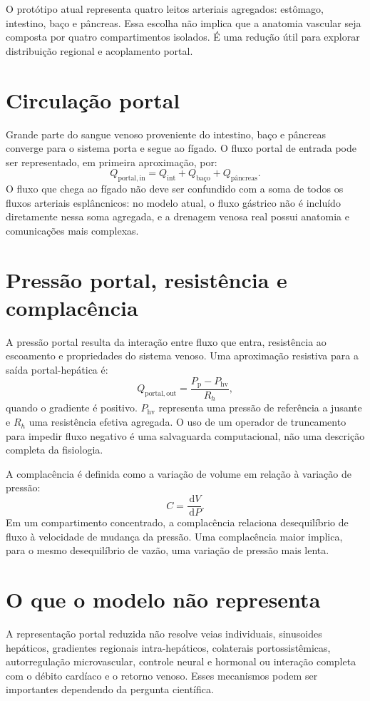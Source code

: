 \documentclass[11pt,a4paper,oneside]{book}
\newcommand{\dd}{\,\mathrm{d}}
\newcommand{\Qportin}{Q_{\mathrm{portal,in}}}
\newcommand{\Qportout}{Q_{\mathrm{portal,out}}}
\newcommand{\Pport}{P_{\mathrm{p}}}
\begin{document}
O protótipo atual representa quatro leitos arteriais agregados: estômago, intestino, baço e pâncreas. Essa escolha não implica que a anatomia vascular seja composta por quatro compartimentos isolados. É uma redução útil para explorar distribuição regional e acoplamento portal.

\section{Circulação portal}
Grande parte do sangue venoso proveniente do intestino, baço e pâncreas converge para o sistema porta e segue ao fígado. O fluxo portal de entrada pode ser representado, em primeira aproximação, por:
\begin{equation}
  \Qportin=Q_{\mathrm{int}}+Q_{\mathrm{baço}}+Q_{\mathrm{pâncreas}}.
  \label{eq:portal-in}
\end{equation}
O fluxo que chega ao fígado não deve ser confundido com a soma de todos os fluxos arteriais esplâncnicos: no modelo atual, o fluxo gástrico não é incluído diretamente nessa soma agregada, e a drenagem venosa real possui anatomia e comunicações mais complexas.

\section{Pressão portal, resistência e complacência}
A pressão portal resulta da interação entre fluxo que entra, resistência ao escoamento e propriedades do sistema venoso. Uma aproximação resistiva para a saída portal-hepática é:
\begin{equation}
  \Qportout=\frac{\Pport-P_{\mathrm{hv}}}{R_h},
  \label{eq:portal-out}
\end{equation}
quando o gradiente é positivo. $P_{\mathrm{hv}}$ representa uma pressão de referência a jusante e $R_h$ uma resistência efetiva agregada. O uso de um operador de truncamento para impedir fluxo negativo é uma salvaguarda computacional, não uma descrição completa da fisiologia.

A complacência é definida como a variação de volume em relação à variação de pressão:
\begin{equation}
  C=\frac{\dd V}{\dd P}.
\end{equation}
Em um compartimento concentrado, a complacência relaciona desequilíbrio de fluxo à velocidade de mudança da pressão. Uma complacência maior implica, para o mesmo desequilíbrio de vazão, uma variação de pressão mais lenta.

\section{O que o modelo não representa}
A representação portal reduzida não resolve veias individuais, sinusoides hepáticos, gradientes regionais intra-hepáticos, colaterais portossistêmicas, autorregulação microvascular, controle neural e hormonal ou interação completa com o débito cardíaco e o retorno venoso. Esses mecanismos podem ser importantes dependendo da pergunta científica.
\end{document}
